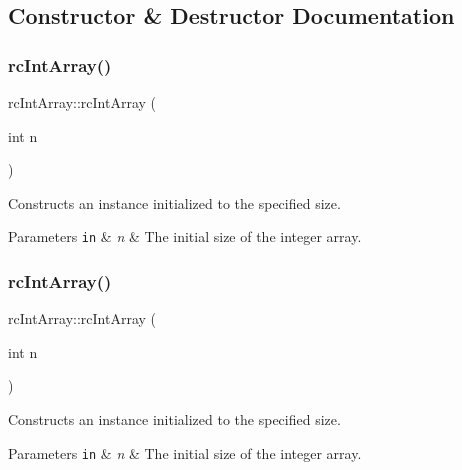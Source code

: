 \subsection{Constructor \& Destructor Documentation}
\mbox{\label{classrcIntArray_ae24aed0e0cb7e79fc0a34de088eba93a}} 
\subsubsection{\texorpdfstring{rc\+Int\+Array()}{rcIntArray()}\hspace{0.1cm}{\footnotesize\ttfamily [1/2]}}
{\footnotesize\ttfamily rc\+Int\+Array\+::rc\+Int\+Array (\begin{DoxyParamCaption}\item[{int}]{n }\end{DoxyParamCaption})\hspace{0.3cm}{\ttfamily [inline]}}

Constructs an instance initialized to the specified size. 
\begin{DoxyParams}[1]{Parameters}
\mbox{\tt in}  & {\em n} & The initial size of the integer array. \\
\hline
\end{DoxyParams}
\mbox{\label{classrcIntArray_ae24aed0e0cb7e79fc0a34de088eba93a}} 
\subsubsection{\texorpdfstring{rc\+Int\+Array()}{rcIntArray()}\hspace{0.1cm}{\footnotesize\ttfamily [2/2]}}
{\footnotesize\ttfamily rc\+Int\+Array\+::rc\+Int\+Array (\begin{DoxyParamCaption}\item[{int}]{n }\end{DoxyParamCaption})\hspace{0.3cm}{\ttfamily [inline]}}

Constructs an instance initialized to the specified size. 
\begin{DoxyParams}[1]{Parameters}
\mbox{\tt in}  & {\em n} & The initial size of the integer array. \\
\hline
\end{DoxyParams}


